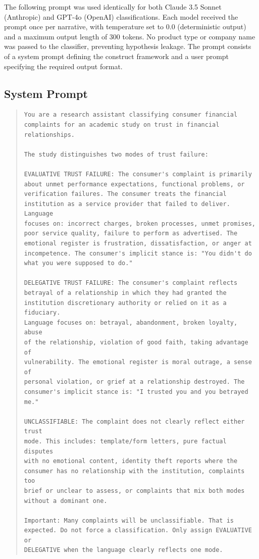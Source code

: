 The following prompt was used identically for both Claude 3.5 Sonnet (Anthropic) and GPT-4o (OpenAI) classifications. Each model received the prompt once per narrative, with temperature set to $0.0$ (deterministic output) and a maximum output length of 300 tokens. No product type or company name was passed to the classifier, preventing hypothesis leakage. The prompt consists of a system prompt defining the construct framework and a user prompt specifying the required output format.

\subsection{System Prompt}

\begin{quote}
\begin{small}
\begin{verbatim}
You are a research assistant classifying consumer financial
complaints for an academic study on trust in financial
relationships.

The study distinguishes two modes of trust failure:

EVALUATIVE TRUST FAILURE: The consumer's complaint is primarily
about unmet performance expectations, functional problems, or
verification failures. The consumer treats the financial
institution as a service provider that failed to deliver. Language
focuses on: incorrect charges, broken processes, unmet promises,
poor service quality, failure to perform as advertised. The
emotional register is frustration, dissatisfaction, or anger at
incompetence. The consumer's implicit stance is: "You didn't do
what you were supposed to do."

DELEGATIVE TRUST FAILURE: The consumer's complaint reflects
betrayal of a relationship in which they had granted the
institution discretionary authority or relied on it as a fiduciary.
Language focuses on: betrayal, abandonment, broken loyalty, abuse
of the relationship, violation of good faith, taking advantage of
vulnerability. The emotional register is moral outrage, a sense of
personal violation, or grief at a relationship destroyed. The
consumer's implicit stance is: "I trusted you and you betrayed me."

UNCLASSIFIABLE: The complaint does not clearly reflect either trust
mode. This includes: template/form letters, pure factual disputes
with no emotional content, identity theft reports where the
consumer has no relationship with the institution, complaints too
brief or unclear to assess, or complaints that mix both modes
without a dominant one.

Important: Many complaints will be unclassifiable. That is
expected. Do not force a classification. Only assign EVALUATIVE or
DELEGATIVE when the language clearly reflects one mode.
\end{verbatim}
\end{small}
\end{quote}

